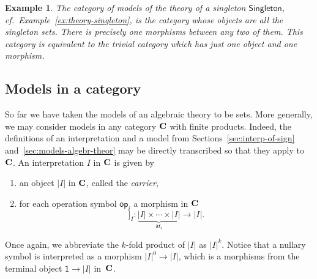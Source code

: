 \documentclass{amsart}
\newcommand{\theory}[1]{\mathsf{#1}} %
\newcommand{\category}[1]{\text{\textbf{#1}}} %
\newcommand{\carrier}[1]{|#1|} %
\newcommand{\op}[1]{\mathsf{op}_{#1}} %
\newcommand{\arity}[1]{\mathsf{ar}_{#1}} %
\newcommand{\one}{\mathsf{1}} %
\newcommand{\sem}[1]{[\![#1]\!]} %
\newtheorem{example}[definition]{Example}
\begin{document}
\begin{example}
  The category of models of the theory of a singleton $\theory{Singleton}$, cf.\
  Example~\ref{ex:theory-singleton}, is the category whose objects are all the singleton
  sets. There is precisely one morphisms between any two of them. This category is
  equivalent to the trivial category which has just one object and one morphism.
\end{example}

\subsection{Models in a category}
\label{sec:models-category}

So far we have taken the models of an algebraic theory to be sets. More generally, we may
consider models in any category $\category{C}$ with finite products. Indeed, the
definitions of an interpretation and a model from Sections~\ref{sec:interp-of-sign}
and~\ref{sec:models-algebr-theor} may be directly transcribed so that they apply
to~$\category{C}$. An interpretation $I$ in $\category{C}$ is given by
%
\begin{enumerate}
\item an object $\carrier{I}$ in $\category{C}$, called the \emph{carrier},
\item for each operation symbol $\op{i}$ a morphism in $\category{C}$
  \begin{equation*}
    \sem{\op{i}}_I : \underbrace{\carrier{I} \times \cdots \times \carrier{I}}_{\arity{i}} \to \carrier{I}.
  \end{equation*}
\end{enumerate}
%
Once again, we abbreviate the $k$-fold product of $\carrier{I}$ as $\carrier{I}^k$. Notice that a nullary
symbol is interpreted as a morphism $\carrier{I}^0 \to \carrier{I}$, which is a morphisms from the
terminal object $\one \to \carrier{I}$ in~$\category{C}$.
\end{document}
